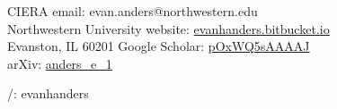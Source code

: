 \documentclass[11pt,letterpaper,sans]{moderncv} %
\newcommand{\leftright}[2]{#1 \hfill #2\\}
\newcommand{\rtxt}[1]{\raggedleft \noindent #1 \\ \raggedright}
\begin{document}

\makecvtitle %
\leftright{CIERA}{email: evan.anders@northwestern.edu}
\leftright{Northwestern University}{website: \href{http://evanhanders.bitbucket.io}{evanhanders.bitbucket.io}}
\leftright{Evanston, IL 60201}{Google Scholar: \href{https://scholar.google.com/citations?user=pOxWQ5sAAAAJ}{pOxWQ5sAAAAJ}}
\rtxt{arXiv: \href{https://arxiv.org/a/anders\_e\_1.html}{anders\_e\_1}}
\rtxt{\href{https://www.linkedin.com/in/evanhanders/}{\faLinkedinSquare}/\href{https://github.com/evanhanders/}{\faGithubSquare}: evanhanders}


%
%
\end{document}
